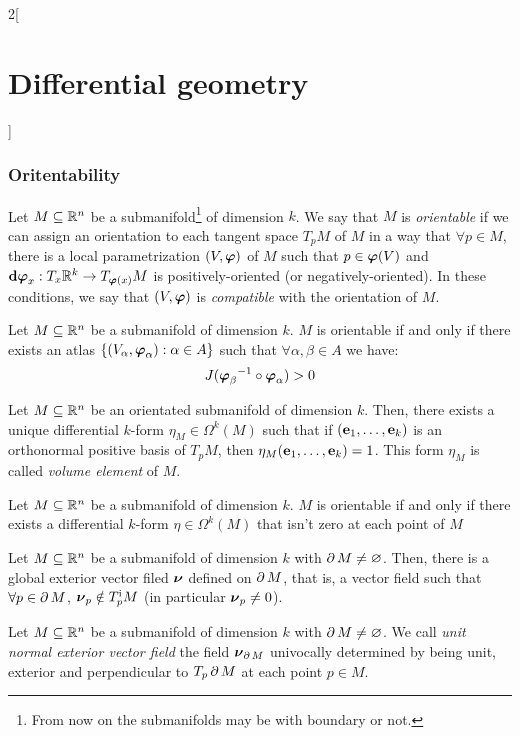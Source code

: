 \documentclass[../../../main_math.tex]{subfiles}
\begin{document}
\begin{multicols}{2}[\section{Differential geometry}]
  \subsubsection{Oritentability}
  \begin{definition}
    Let $M\subseteq\mathbb{R}^n$ be a submanifold\footnote{From now on the submanifolds may be with boundary or not.} of dimension $k$. We say that $M$ is \emph{orientable} if we can assign an orientation to each tangent space $T_pM$ of $M$ in a way that $\forall p\in M$, there is a local parametrization $(V,\boldsymbol{\mathrm{\varphi}})$ of $M$ such that $p\in\boldsymbol{\mathrm{\varphi}}(V)$ and $\boldsymbol{\mathrm{d\varphi}}_x:T_x\mathbb{R}^k\rightarrow T_{\boldsymbol{\mathrm{\varphi}}(x)}M$ is positively-oriented (or negatively-oriented). In these conditions, we say that $(V,\boldsymbol{\mathrm{\varphi}})$ is \emph{compatible} with the orientation of $M$.
  \end{definition}
  \begin{proposition}
    Let $M\subseteq\mathbb{R}^n$ be a submanifold of dimension $k$. $M$ is orientable if and only if there exists an atlas $\{(V_\alpha,\boldsymbol{\mathrm{\varphi}}_\alpha):\alpha\in A\}$ such that $\forall \alpha,\beta\in A$ we have: $$J({\boldsymbol{\mathrm{\varphi}}_\beta}^{-1}\circ\boldsymbol{\mathrm{\varphi}}_\alpha)>0$$
  \end{proposition}
  \begin{proposition}
    Let $M\subseteq\mathbb{R}^n$ be an orientated submanifold of dimension $k$. Then, there exists a unique differential $k$-form $\eta_M\in\Omega^k(M)$ such that if $(\boldsymbol{\mathrm{e}}_1,\ldots,\boldsymbol{\mathrm{e}}_k)$ is an orthonormal positive basis of $T_pM$, then $\eta_M(\boldsymbol{\mathrm{e}}_1,\ldots,\boldsymbol{\mathrm{e}}_k)=1$. This form $\eta_M$ is called \emph{volume element} of $M$.
  \end{proposition}
  \begin{proposition}
    Let $M\subseteq\mathbb{R}^n$ be a submanifold of dimension $k$. $M$ is orientable if and only if there exists a differential $k$-form $\eta\in\Omega^k(M)$ that isn't zero at each point of $M$
  \end{proposition}
  \begin{lemma}
    Let $M\subseteq\mathbb{R}^n$ be a submanifold of dimension $k$ with $\operatorname{\partial}{M}\ne\varnothing$. Then, there is a global exterior vector filed $\boldsymbol{\mathrm{\nu}}$ defined on $\operatorname{\partial}{M}$, that is, a vector field such that $\forall p\in\operatorname{\partial}{M}$, $\boldsymbol{\mathrm{\nu}}_p\notin T_p^\text{i}M$ (in particular $\boldsymbol{\mathrm{\nu}}_p\ne 0$).
  \end{lemma}
  \begin{definition}
    Let $M\subseteq\mathbb{R}^n$ be a submanifold of dimension $k$ with $\operatorname{\partial}{M}\ne\varnothing$. We call \emph{unit normal exterior vector field} the field $\boldsymbol{\mathrm{\nu}}_{\operatorname{\partial}{M}}$ univocally determined by being unit, exterior and perpendicular to $T_p\operatorname{\partial}{M}$ at each point $p\in M$.

\end{definition}
\end{multicols}
\end{document}
